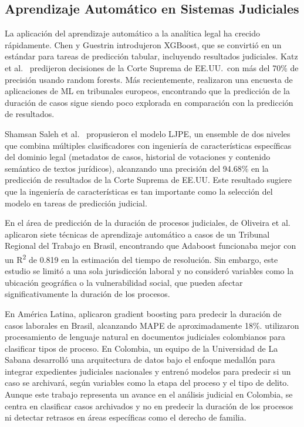 \documentclass[runningheads]{llncs}
\begin{document}
\subsection{Aprendizaje Autom\'{a}tico en Sistemas Judiciales}

La aplicaci\'{o}n del aprendizaje autom\'{a}tico a la anal\'{i}tica legal ha crecido r\'{a}pidamente. Chen y Guestrin \cite{chen2016xgboost} introdujeron XGBoost, que se convirti\'{o} en un est\'{a}ndar para tareas de predicci\'{o}n tabular, incluyendo resultados judiciales. Katz et al.\ \cite{katz2017supreme} predijeron decisiones de la Corte Suprema de EE.UU.\ con m\'{a}s del 70\% de precisi\'{o}n usando random forests. M\'{a}s recientemente, \cite{medvedeva2020machine} realizaron una encuesta de aplicaciones de ML en tribunales europeos, encontrando que la predicci\'{o}n de la duraci\'{o}n de casos sigue siendo poco explorada en comparaci\'{o}n con la predicci\'{o}n de resultados.

Shamsan Saleh et al.\ \cite{shamsan2026predictive} propusieron el modelo LJPE, un ensemble de dos niveles que combina m\'{u}ltiples clasificadores con ingenier\'{i}a de caracter\'{i}sticas espec\'{i}ficas del dominio legal (metadatos de casos, historial de votaciones y contenido sem\'{a}ntico de textos jur\'{i}dicos), alcanzando una precisi\'{o}n del 94.68\% en la predicci\'{o}n de resultados de la Corte Suprema de EE.UU. Este resultado sugiere que la ingenier\'{i}a de caracter\'{i}sticas es tan importante como la selecci\'{o}n del modelo en tareas de predicci\'{o}n judicial.

En el \'{a}rea de predicci\'{o}n de la duraci\'{o}n de procesos judiciales, de Oliveira et al.\ \cite{deoliveira2022predicting} aplicaron siete t\'{e}cnicas de aprendizaje autom\'{a}tico a casos de un Tribunal Regional del Trabajo en Brasil, encontrando que Adaboost funcionaba mejor con un R\textsuperscript{2} de 0.819 en la estimaci\'{o}n del tiempo de resoluci\'{o}n. Sin embargo, este estudio se limit\'{o} a una sola jurisdicci\'{o}n laboral y no consider\'{o} variables como la ubicaci\'{o}n geogr\'{a}fica o la vulnerabilidad social, que pueden afectar significativamente la duraci\'{o}n de los procesos.

En Am\'{e}rica Latina, \cite{gonzalez2022legal} aplicaron gradient boosting para predecir la duraci\'{o}n de casos laborales en Brasil, alcanzando MAPE de aproximadamente 18\%. \cite{perez2023judicial} utilizaron procesamiento de lenguaje natural en documentos judiciales colombianos para clasificar tipos de proceso. En Colombia, un equipo de la Universidad de La Sabana \cite{unisabana2026archivo} desarroll\'{o} una arquitectura de datos bajo el enfoque medall\'{o}n para integrar expedientes judiciales nacionales y entren\'{o} modelos para predecir si un caso se archivar\'{a}, seg\'{u}n variables como la etapa del proceso y el tipo de delito. Aunque este trabajo representa un avance en el an\'{a}lisis judicial en Colombia, se centra en clasificar casos archivados y no en predecir la duraci\'{o}n de los procesos ni detectar retrasos en \'{a}reas espec\'{i}ficas como el derecho de familia.
\end{document}
